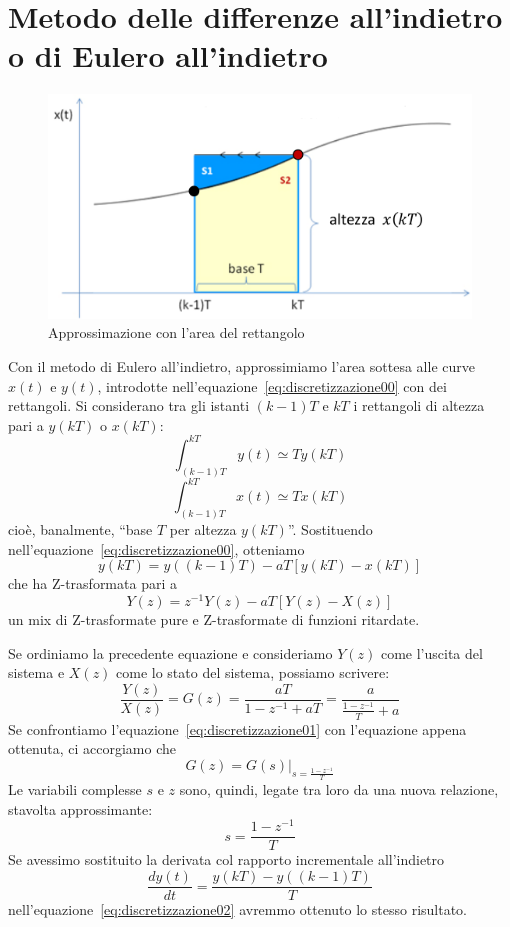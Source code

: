 \documentclass[a4paper]{report}
\begin{document}
\section{Metodo delle differenze all'indietro o di Eulero
  all'indietro}
\begin{figure}[!h]
  \begin{center}
    \includegraphics[scale=0.4]{./figures/euleroIndietro00.png}
    \caption{Approssimazione con l'area del
      rettangolo}\label{fig:euleroIndietro00} 
  \end{center}
\end{figure}
Con il metodo di Eulero all'indietro, approssimiamo l'area sottesa
alle curve $x(t)$ e $y(t)$, introdotte
nell'equazione~\ref{eq:discretizzazione00} con dei rettangoli. Si
considerano tra gli istanti $(k - 1)T$ e $kT$ i rettangoli di altezza
pari a $y(kT)$ o $x(kT)$:
\[
\int_{(k - 1)T}^{kT} y(t) \simeq Ty(kT)
\]
\[
\int_{(k - 1)T}^{kT} x(t) \simeq Tx(kT)
\]
cio\`e, banalmente, ``base $T$ per altezza $y(kT)$''. Sostituendo
nell'equazione~\ref{eq:discretizzazione00}, otteniamo
\begin{equation}\label{eq:discretizzazioneEuleroIndietro}
  y(kT) = y((k - 1)T) - aT[y(kT) - x(kT)]
\end{equation}
che ha Z-trasformata pari a
\[
Y(z) = z^{-1}Y(z) - aT[Y(z) - X(z)]
\]
un mix di Z-trasformate pure e Z-trasformate di funzioni ritardate.

Se ordiniamo la precedente equazione e consideriamo $Y(z)$ come
l'uscita del sistema e $X(z)$ come lo stato del sistema, possiamo
scrivere:
\[
\dfrac{Y(z)}{X(z)} = G(z) = \dfrac{aT}{1 - z^{-1} + aT} =
\dfrac{a}{\frac{1 - z^{-1}}{T} + a}
\]
Se confrontiamo l'equazione~\ref{eq:discretizzazione01} con
l'equazione appena ottenuta, ci accorgiamo che
\[
G(z) = G(s)|_{s = \frac{1 - z^{-1}}{T}}
\]
Le variabili complesse $s$ e $z$ sono, quindi, legate tra loro da una
nuova relazione, stavolta approssimante:
\begin{equation}\label{eq:approssimanteEuleroIndietro}
  s = \dfrac{1 - z^{-1}}{T}
\end{equation}
Se avessimo sostituito la derivata col rapporto incrementale
all'indietro 
\[
\dfrac{dy(t)}{dt} = \dfrac{y(kT) - y((k - 1)T)}{T}
\]
nell'equazione~\ref{eq:discretizzazione02} avremmo ottenuto lo stesso
risultato. 
\end{document}
